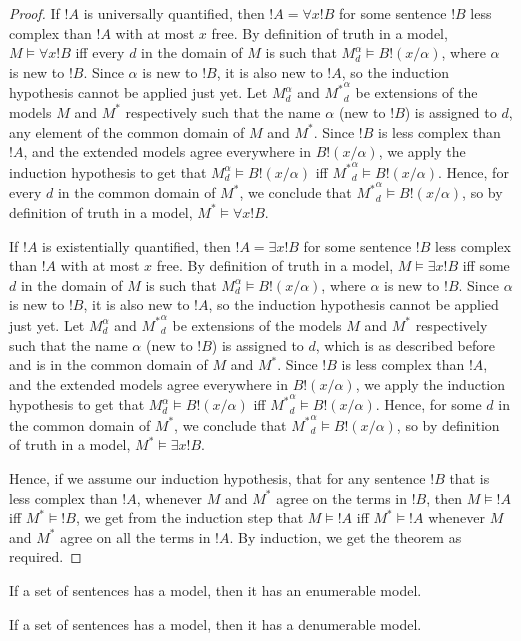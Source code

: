 \documentclass[syntax-and-semantics]{subfiles}
\begin{document}
\begin{proof}
If $!A$ is universally quantified, then $!A = \forall x !B$ for some sentence $!B$ less complex than $!A$ with at most $x$ free. By definition of truth in a model, $M \vDash \forall x !B$ iff every $d$ in the domain of $M$ is such that $M^\alpha_d \vDash B!(x/\alpha)$, where $\alpha$ is new to $!B$. Since $\alpha$ is new to $!B$, it is also new to $!A$, so the induction hypothesis cannot be applied just yet. Let $M^\alpha_d$ and ${M^*}^\alpha_d$ be extensions of the models $M$ and $M^*$ respectively such that the name $\alpha$ (new to $!B$) is assigned to $d$, any element of the common domain of $M$ and $M^*$. Since $!B$ is less complex than $!A$, and the extended models agree everywhere in $B!(x/\alpha)$, we apply the induction hypothesis to get that $M^\alpha_d \vDash B!(x/\alpha)$ iff ${M^*}^\alpha_d \vDash B!(x/\alpha)$. Hence, for every $d$ in the common domain of $M^*$, we conclude that ${M^*}^\alpha_d \vDash B!(x/\alpha)$, so by definition of truth in a model, $M^* \vDash \forall x !B$.  

If $!A$ is existentially quantified, then $!A = \exists x !B$ for some sentence $!B$ less complex than $!A$ with at most $x$ free. By definition of truth in a model, $M \vDash \exists x !B$ iff some $d$ in the domain of $M$ is such that $M^\alpha_d \vDash B!(x/\alpha)$, where $\alpha$ is new to $!B$. Since $\alpha$ is new to $!B$, it is also new to $!A$, so the induction hypothesis cannot be applied just yet. Let $M^\alpha_d$ and ${M^*}^\alpha_d$ be extensions of the models $M$ and $M^*$ respectively such that the name $\alpha$ (new to $!B$) is assigned to $d$, which is as described before and is in the common domain of $M$ and $M^*$. Since $!B$ is less complex than $!A$, and the extended models agree everywhere in $B!(x/\alpha)$, we apply the induction hypothesis to get that $M^\alpha_d \vDash B!(x/\alpha)$ iff ${M^*}^\alpha_d \vDash B!(x/\alpha)$. Hence, for some $d$ in the common domain of $M^*$, we conclude that ${M^*}^\alpha_d \vDash B!(x/\alpha)$, so by definition of truth in a model, $M^* \vDash \exists x !B$.

Hence, if we assume our induction hypothesis, that for any sentence $!B$ that is less complex than $!A$, whenever $M$ and $M^*$ agree on the terms in $!B$, then $M\vDash !A$ iff $M^* \vDash !B$, we get from the induction step that $M \vDash !A$ iff $M^* \vDash !A$ whenever $M$ and $M^*$ agree on all the terms in $!A$. By induction, we get the theorem as required.
\end{proof}



\begin{thm}
If a set of sentences has a model, then it has an enumerable model.
\end{thm}

\begin{thm}[L\"owenheim-Skolem for FOL without =]
If a set of sentences has a model, then it has a denumerable model.
\end{thm}
\end{document}
